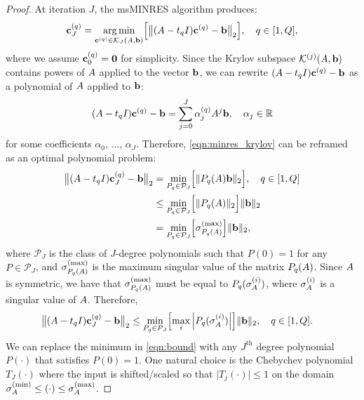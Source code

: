 \begin{proof}
	At iteration $J$, the msMINRES algorithm produces:
	\begin{align}
    \mathbf{c}^{(q)}_J
    = \operatorname*{arg\,min}_{\mathbf{c}^{(q)} \in \mathcal{K}_J(A, \mathbf{b})} \Bigl[
      \bigl\Vert (A - t_q I) \mathbf{c}^{(q)} - \mathbf{b} \bigr\Vert_2
    \Bigr],
    \quad
    q \in [1, Q],
    \label{eqn:minres_krylov}
	\end{align}
  where we assume $\mathbf{c}_0^{(q)} = \mathbf{0}$ for simplicity.
  Since the Krylov subspace $\mathcal{K}^{(j)} (A, \mathbf{b})$ contains powers of $A$ applied to the vector $\mathbf{b}$, we can rewrite
  $(A - t_q I) \mathbf{c}^{(q)} - \mathbf{b}$
  as a polynomial of $A$ applied to $\mathbf{b}$:
  \[ (A - t_q I) \mathbf{c}^{(q)} - \mathbf{b} = \sum_{j=0}^J \alpha_j^{(q)} A^j \mathbf{b}, \quad \alpha_j \in \mathbb{R} \]
  for some coefficients $\alpha_0$, $\ldots$, $\alpha_J$.
  Therefore, \cref{eqn:minres_krylov} can be reframed as an optimal polynomial problem:
	\begin{align*}
    \bigl\Vert (A - t_q I) \mathbf{c}_J^{(q)} - \mathbf{b} \bigr\Vert_2
    &= \min_{P_q \in \mathcal{P}_J} \Bigl[
      \Vert P_q(A) \mathbf{b} \Vert_2
    \Bigr],
    \quad
    q \in [1, Q]
    \\
    &\leq \min_{P_q \in \mathcal{P}_J} \Bigl[
      \Vert P_q(A) \Vert_2
    \Bigr] \Vert \mathbf{b} \Vert_2
    \\
    &= \min_{P_q \in \mathcal{P}_J} \Bigl[
      \sigma^{(\max)}_{P_q(A)}
    \Bigr] \Vert \mathbf{b} \Vert_2,
  \end{align*}
  where $\mathcal{P}_J$ is the class of $J$-degree polynomials such that $P(0) = 1$ for any $P \in \mathcal{P}_J$,
  and $\sigma^{(\max)}_{P_q(A)}$ is the maximum singular value of the matrix $P_q(A)$.
  Since $A$ is symmetric, we have that $\sigma^{(\max)}_{P_q(A)}$ must be equal to $P_q(\sigma^{(i)}_{A})$, where $\sigma^{(i)}_{A}$ is a singular value of $A$.
  Therefore,
  \begin{align}
    \bigl\Vert (A - t_q I) \mathbf{c}_J^{(q)} - \mathbf{b} \bigr\Vert_2
    &\leq \min_{P_q \in \mathcal{P}_J} \Bigl[
      \max_{i}
      \left\vert P_q(\sigma^{(i)}_{A}) \right\vert
    \Bigr] \Vert \mathbf{b} \Vert_2,
    \quad
    q \in [1, Q].
    \label{eqn:bound}
	\end{align}
  We can replace the minimum in \cref{eqn:bound} with any $J^\text{th}$ degree polynomial $P(\cdot)$ that satisfies $P(0) = 1$.
  One natural choice is the Chebychev polynomial $T_J(\cdot)$ where the input is shifted/scaled so that $\vert T_j(\cdot) \vert \leq 1$ on the domain $\sigma^{(\min)}_{A} \leq (\cdot) \leq \sigma^{(\max)}_{A}$.

\end{proof}
